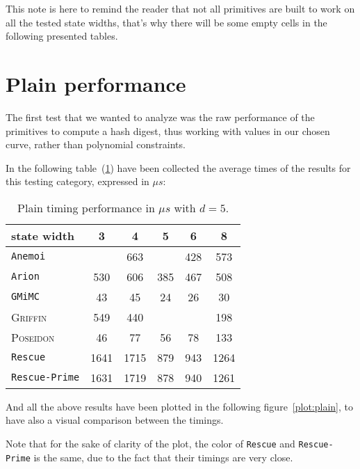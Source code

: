 \documentclass[12pt, a4paper]{report}
\begin{document}
\begin{note}
  This note is here to remind the reader that not all primitives are built to work on all the tested state widths, that's why there will be some empty cells in the following presented tables.
\end{note}

\section{Plain performance}\label{sec:plain}

The first test that we wanted to analyze was the raw performance of the primitives to compute a hash digest, thus working with values in our chosen curve, rather than polynomial constraints.

In the following table~(\ref{tab:plain}) have been collected the average times of the results for this testing category, expressed in $\mu s$:

\begin{table}[H]
  \begin{center}
    \begin{tabular}{|l|c|c|c|c|c|}
      \hline
        state width & 3 & 4 & 5 & 6 & 8 \\
      \hline
        \texttt{Anemoi} & & 663 &  & 428 & 573 \\
        \texttt{Arion} & 530 & 606 & 385 & 467 & 508 \\
        \texttt{GMiMC} & 43 & 45 & \cellcolor{green!35} 24 & 26 & 30 \\
        \textsc{Griffin} & 549 & 440 & & & 198 \\
        \textsc{Poseidon} & 46 & 77 & 56 & 78 & 133 \\
        \texttt{Rescue} & \cellcolor{orange!35} 1641 & \cellcolor{orange!35} 1715 & 879 & 943 & \cellcolor{orange!35} 1264 \\
        \texttt{Rescue-Prime} & \cellcolor{orange!35} 1631 & \cellcolor{red!35} 1719 & 878 & 940 &  \cellcolor{orange!35} 1261 \\
      \hline
    \end{tabular}
  \end{center}
  \caption{Plain timing performance in $\mu s$ with $d = 5$.}\label{tab:plain}
\end{table}

And all the above results have been plotted in the following figure~\ref{plot:plain}, to have also a visual comparison between the timings.

Note that for the sake of clarity of the plot, the color of \texttt{Rescue} and \texttt{Rescue-Prime} is the same, due to the fact that their timings are very close.
\end{document}
